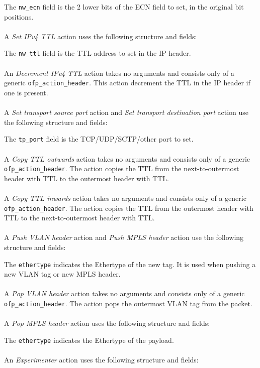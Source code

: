 
The \verb|nw_ecn| field is the 2 lower bits of the ECN field to set, in the original bit positions.
\\\\
A \emph{Set IPv4 TTL} action uses the following structure and fields:


The \verb|nw_ttl| field is the TTL address to set in the IP header.
\\\\
An \emph{Decrement IPv4 TTL} action takes no arguments and consists only of a generic \verb|ofp_action_header|.  This action decrement the TTL in the IP header if one is present.
\\\\
A \emph{Set transport source port} action and \emph{Set transport destination port} action use the following structure and fields:


The \verb|tp_port| field is the TCP/UDP/SCTP/other port to set.
\\\\
A \emph{Copy TTL outwards} action takes no arguments and consists only of a generic \verb|ofp_action_header|. The action copies the TTL from the next-to-outermost header with TTL to the outermost header with TTL.
\\\\
A \emph{Copy TTL inwards} action takes no arguments and consists only of a generic \verb|ofp_action_header|. The action copies the TTL from the outermost header with TTL to the next-to-outermost header with TTL.
\\\\
A \emph{Push VLAN header} action and \emph{Push MPLS header} action use the following structure and fields:


The \verb|ethertype| indicates the Ethertype of the new tag. It is used when pushing a new VLAN tag or new MPLS header.
\\\\
A \emph{Pop VLAN header} action takes no arguments and consists only of a generic \verb|ofp_action_header|. The action pops the outermost VLAN tag from the packet.
\\\\
A \emph{Pop MPLS header} action uses the following structure and fields:


The \verb|ethertype| indicates the Ethertype of the payload.
\\\\
An \emph{Experimenter} action uses the following structure and fields:

